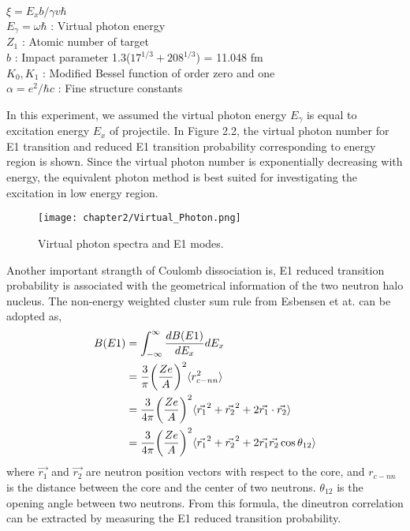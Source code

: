 \begin{adjustwidth}{1cm}{}
    $\xi = E_x b / \gamma v \hbar$ \\
    $E_{\gamma} = \omega \hbar$ : Virtual photon energy\\ 
    $Z_{1}$ : Atomic number of target\\
    $b$ : Impact parameter 1.3($17^{1/3} + 208^{1/3}$) = 11.048 fm\\
    $K_0, K_1$ : Modified Bessel function of order zero and one \\
    $\alpha = e^2 / \hbar c$ : Fine structure constants\\
\end{adjustwidth}
In this experiment, we assumed the virtual photon energy $E_{\gamma}$ is equal to excitation energy $E_x$ of projectile.
 In Figure 2.2, the virtual photon number for E1 transition and reduced E1 transition probability corresponding to energy region is shown. Since the virtual photon number is exponentially decreasing with energy, the equivalent photon method is best suited for investigating the excitation in low energy region. 

\begin{figure}[t]
    \centering
    \texttt{[image: chapter2/Virtual\_Photon.png]}
    \caption[Virtual Photon Spectra and E1 Modes]{Virtual photon spectra and E1 modes. \cite{Nakamura23}}
    \label{fig:Virtual_Photon}
\end{figure}

Another important strangth of Coulomb dissociation is, E1 reduced transition probability is associated with the geometrical information of the two neutron halo nucleus. The non-energy weighted cluster sum rule from Esbensen et at. \cite{Esbensen} can be adopted as,
\begin{align}
    B(E1) &= \int_{-\infty}^{\infty} \frac{dB(E1)}{dE_x}dE_x \notag \\
        &= \frac{3}{\pi} \bigg(\frac{Z e}{A}\bigg)^2 \langle r^2_{c-nn} \rangle \notag \\
        &= \frac{3}{4 \pi} \bigg(\frac{Z e}{A}\bigg)^2 \langle \vec{r_1}^2 + \vec{r_2}^2 + 2 \vec{r_1} \cdot \vec{r_2} \rangle \notag \\
        &= \frac{3}{4 \pi} \bigg(\frac{Z e}{A}\bigg)^2 \langle \vec{r_1}^2 + \vec{r_2}^2 + 2\vec{r_1} \vec{r_2} \cos \theta_{12} \rangle
\end{align}
where $\vec{r_1}$ and $\vec{r_2}$ are neutron position vectors with respect to the core, and $r_{c-nn}$ is the distance between the core and the center of two neutrons. $\theta_{12}$ is the opening angle between two neutrons. From this formula, the dineutron correlation can be extracted by measuring the E1 reduced transition probability. 

